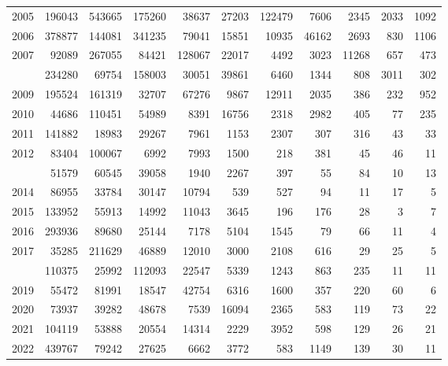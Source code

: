 \documentclass[
]{article}
\begin{document}
\begin{longtable}[t]{lrrrrrrrrrr}
2005 & 196043 & 543665 & 175260 & 38637 & 27203 & 122479 & 7606 & 2345 & 2033 & 1092\\
2006 & 378877 & 144081 & 341235 & 79041 & 15851 & 10935 & 46162 & 2693 & 830 & 1106\\
2007 & 92089 & 267055 & 84421 & 128067 & 22017 & 4492 & 3023 & 11268 & 657 & 473\\
\addlinespace
2008 & 234280 & 69754 & 158003 & 30051 & 39861 & 6460 & 1344 & 808 & 3011 & 302\\
2009 & 195524 & 161319 & 32707 & 67276 & 9867 & 12911 & 2035 & 386 & 232 & 952\\
2010 & 44686 & 110451 & 54989 & 8391 & 16756 & 2318 & 2982 & 405 & 77 & 235\\
2011 & 141882 & 18983 & 29267 & 7961 & 1153 & 2307 & 307 & 316 & 43 & 33\\
2012 & 83404 & 100067 & 6992 & 7993 & 1500 & 218 & 381 & 45 & 46 & 11\\
\addlinespace
2013 & 51579 & 60545 & 39058 & 1940 & 2267 & 397 & 55 & 84 & 10 & 13\\
2014 & 86955 & 33784 & 30147 & 10794 & 539 & 527 & 94 & 11 & 17 & 5\\
2015 & 133952 & 55913 & 14992 & 11043 & 3645 & 196 & 176 & 28 & 3 & 7\\
2016 & 293936 & 89680 & 25144 & 7178 & 5104 & 1545 & 79 & 66 & 11 & 4\\
2017 & 35285 & 211629 & 46889 & 12010 & 3000 & 2108 & 616 & 29 & 25 & 5\\
\addlinespace
2018 & 110375 & 25992 & 112093 & 22547 & 5339 & 1243 & 863 & 235 & 11 & 11\\
2019 & 55472 & 81991 & 18547 & 42754 & 6316 & 1600 & 357 & 220 & 60 & 6\\
2020 & 73937 & 39282 & 48678 & 7539 & 16094 & 2365 & 583 & 119 & 73 & 22\\
2021 & 104119 & 53888 & 20554 & 14314 & 2229 & 3952 & 598 & 129 & 26 & 21\\
2022 & 439767 & 79242 & 27625 & 6662 & 3772 & 583 & 1149 & 139 & 30 & 11\\*
\end{longtable}
\end{document}
